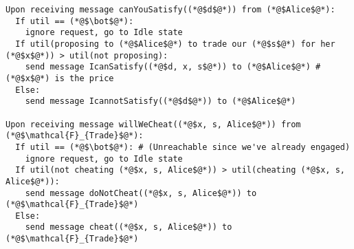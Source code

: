 \begin{lstlisting}[label=satprot, style=numbers]
Upon receiving message canYouSatisfy((*@$d$@*)) from (*@$Alice$@*):
  If util == (*@$\bot$@*):
    ignore request, go to Idle state
  If util(proposing to (*@$Alice$@*) to trade our (*@$s$@*) for her (*@$x$@*)) > util(not proposing):
    send message IcanSatisfy((*@$d, x, s$@*)) to (*@$Alice$@*) # (*@$x$@*) is the price
  Else:
    send message IcannotSatisfy((*@$d$@*)) to (*@$Alice$@*)

Upon receiving message willWeCheat((*@$x, s, Alice$@*)) from (*@$\mathcal{F}_{Trade}$@*):
  If util == (*@$\bot$@*): # (Unreachable since we've already engaged)
    ignore request, go to Idle state
  If util(not cheating (*@$x, s, Alice$@*)) > util(cheating (*@$x, s, Alice$@*)):
    send message doNotCheat((*@$x, s, Alice$@*)) to (*@$\mathcal{F}_{Trade}$@*)
  Else:
    send message cheat((*@$x, s, Alice$@*)) to (*@$\mathcal{F}_{Trade}$@*)
\end{lstlisting}

